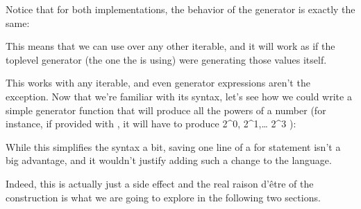 \documentclass[a4paper,10pt,english]{sphinxmanual}
\begin{document}
Notice that for both implementations, the behavior of the generator is exactly the same:

\begin{sphinxVerbatim}[commandchars=\\\{\}]
 \PYG{p}{[}\PYG{p}{]}   
\end{sphinxVerbatim}

This means that we can use  over any other iterable, and it will work as if the
top\sphinxhyphen{}level generator (the one the  is using) were generating those values itself.

This works with any iterable, and even generator expressions aren’t the exception. Now
that we’re familiar with its syntax, let’s see how we could write a simple generator function
that will produce all the powers of a number (for instance, if provided with
, it will have to produce 2\textasciicircum{}0, 2\textasciicircum{}1,… 2\textasciicircum{}3 ):

\begin{sphinxVerbatim}[commandchars=\\\{\}]
  
             
\end{sphinxVerbatim}

While this simplifies the syntax a bit, saving one line of a for statement isn’t a big
advantage, and it wouldn’t justify adding such a change to the language.

Indeed, this is actually just a side effect and the real raison d’être of the 
construction is what we are going to explore in the following two sections.
\end{document}
